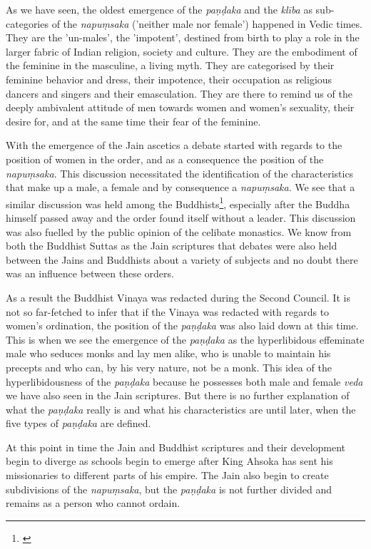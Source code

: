 As we have seen, the oldest emergence of the {\em paṇḍaka} and the {\em klība} as sub-categories of the {\em napuṃsaka} ('neither male nor female') happened in Vedic times. They are the 'un-males', the 'impotent', destined from birth to play a role in the larger fabric of Indian religion, society and culture. They are the embodiment of the feminine in the masculine, a living myth. They are categorised by their feminine behavior and dress, their impotence, their occupation as religious dancers and singers and their emasculation. They are there to remind us of the deeply ambivalent attitude of men towards women and women's sexuality, their desire for, and at the same time their fear of the feminine.

With the emergence of the Jain ascetics a debate started with regards to the position of women in the order, and as a consequence the position of the {\em napuṃsaka}. This discussion necessitated the identification of the characteristics that make up a male, a female and by consequence a {\em napuṃsaka}. We see that a similar discussion was held among the Buddhists\footnote{\cite{sujato2009}}, especially after the Buddha himself passed away and the order found itself without a leader. This discussion was also fuelled by the public opinion of the celibate monastics. We know from both the Buddhist Suttas as the Jain scriptures that debates were also held between the Jains and Buddhists about a variety of subjects and no doubt there was an influence between these orders.

As a result the Buddhist Vinaya was redacted during the Second Council. It is not so far-fetched to infer that if the Vinaya was redacted with regards to women's ordination, the position of the {\em paṇḍaka} was also laid down at this time. This is when we see the emergence of the {\em paṇḍaka} as the hyperlibidous effeminate male who seduces monks and lay men alike, who is unable to maintain his precepts and who can, by his very nature, not be a monk. This idea of the hyperlibidousness of the {\em paṇḍaka} because he possesses both male and female {\em veda} we have also seen in the Jain scriptures. But there is no further explanation of what the {\em paṇḍaka} really is and what his characteristics are until later, when the five types of {\em paṇḍaka} are defined. 

At this point in time the Jain and Buddhist scriptures and their development begin to diverge as schools begin to emerge after King Ahsoka has sent his missionaries to different parts of his empire. The Jain also begin to create subdivisions of the {\em napuṃsaka}, but the {\em paṇḍaka} is not further divided and remains as a person who cannot ordain. 

